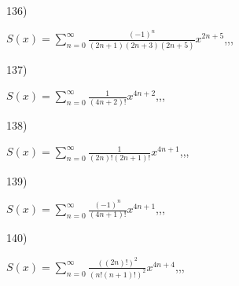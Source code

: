 \documentclass[11pt, ukrainian]{article}
\begin{document}
\par
\vspace{0.9cm}
136) \space 
{%
{$S(x)=\sum\limits_{n=0}^{\infty}{\frac{(-1)^n}{(2n+1)(2n+3)(2n+5)}}{x^{{2n+5}}}$},,, \par \smallskip  
}
\par
\vspace{0.9cm}
137) \space 
{%
{$S(x)=\sum\limits_{n=0}^{\infty}{\frac{1}{(4n+2)!}}{x^{{4n+2}}}$},,, \par \smallskip  
}
\par
\vspace{0.9cm}
138) \space 
{%
{$S(x)=\sum\limits_{n=0}^{\infty}{\frac{1}{(2n)!(2n+1)!}}{x^{{4n+1}}}$},,, \par \smallskip  
}
\par
\vspace{0.9cm}
139) \space 
{%
{$S(x)=\sum\limits_{n=0}^{\infty}{\frac{(-1)^n}{(4n+1)!}}{x^{{4n+1}}}$},,, \par \smallskip  
}
\par
\vspace{0.9cm}
140) \space 
{%
{$S(x)=\sum\limits_{n=0}^{\infty}{\frac{((2n)!)^2}{(n!(n+1)!)^2}}{x^{{4n+4}}}$},,, \par \smallskip  
}
\par
\newpage
\end{document}
